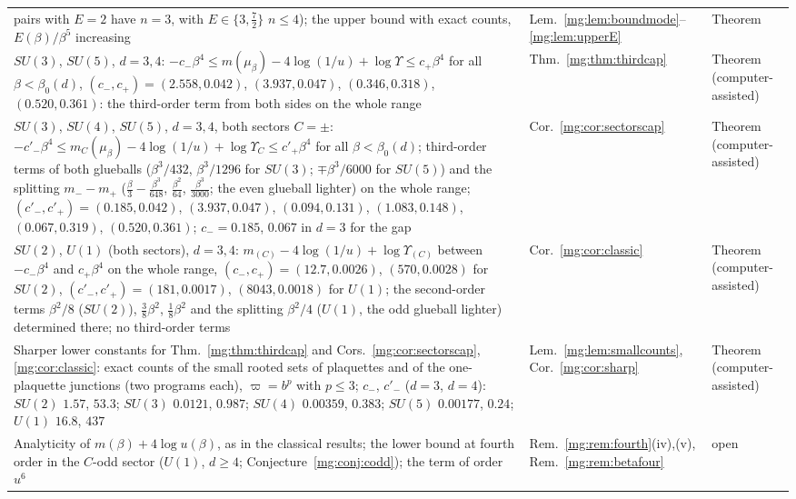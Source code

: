 \documentclass[11pt,a4paper]{article}
\theoremstyle{definition}
\theoremstyle{remark}
\begin{document}
\begin{longtable}{@{}p{}p{}p{}@{}}
pairs with $E=2$ have $n=3$, with $E\in\{3,\frac72\}$ $n\le4$); the upper bound with exact counts, $E(\beta)/\beta^5$ increasing & Lem.~\ref{mg:lem:boundmode}--\ref{mg:lem:upperE} & Theorem\\
$SU(3)$, $SU(5)$, $d=3,4$: $-c_-\beta^4\le m(\mu_\beta)-4\log(1/u)+\log\Upsilon\le c_+\beta^4$ for all $\beta<\beta_0(d)$, $(c_-,c_+)=(2.558,0.042)$, $(3.937,0.047)$, $(0.346,0.318)$, $(0.520,0.361)$: the third-order term from both sides on the whole range & Thm.~\ref{mg:thm:thirdcap} & Theorem (computer-assisted)\\
$SU(3)$, $SU(4)$, $SU(5)$, $d=3,4$, both sectors $C=\pm$: $-c'_-\beta^4\le m_C(\mu_\beta)-4\log(1/u)+\log\Upsilon_C\le c'_+\beta^4$ for all $\beta<\beta_0(d)$; third-order terms of both glueballs ($\beta^3/432$, $\beta^3/1296$ for $SU(3)$; $\mp\beta^3/6000$ for $SU(5)$) and the splitting $m_--m_+$ ($\frac\beta3-\frac{\beta^3}{648}$, $\frac{\beta^2}{64}$, $\frac{\beta^3}{3000}$; the even glueball lighter) on the whole range; $(c'_-,c'_+)=(0.185,0.042)$, $(3.937,0.047)$, $(0.094,0.131)$, $(1.083,0.148)$, $(0.067,0.319)$, $(0.520,0.361)$; $c_-=0.185$, $0.067$ in $d=3$ for the gap & Cor.~\ref{mg:cor:sectorscap} & Theorem (computer-assisted)\\
$SU(2)$, $U(1)$ (both sectors), $d=3,4$: $m_{(C)}-4\log(1/u)+\log\Upsilon_{(C)}$ between $-c_-\beta^4$ and $c_+\beta^4$ on the whole range, $(c_-,c_+)=(12.7,0.0026)$, $(570,0.0028)$ for $SU(2)$, $(c'_-,c'_+)=(181,0.0017)$, $(8043,0.0018)$ for $U(1)$; the second-order terms $\beta^2/8$ ($SU(2)$), $\frac38\beta^2$, $\frac18\beta^2$ and the splitting $\beta^2/4$ ($U(1)$, the odd glueball lighter) determined there; no third-order terms & Cor.~\ref{mg:cor:classic} & Theorem (computer-assisted)\\
Sharper lower constants for Thm.~\ref{mg:thm:thirdcap} and Cors.~\ref{mg:cor:sectorscap}, \ref{mg:cor:classic}: exact counts of the small rooted sets of plaquettes and of the one-plaquette junctions (two programs each), $\varpi=b^p$ with $p\le3$; $c_-$, $c'_-$ ($d=3$, $d=4$): $SU(2)$ $1.57$, $53.3$; $SU(3)$ $0.0121$, $0.987$; $SU(4)$ $0.00359$, $0.383$; $SU(5)$ $0.00177$, $0.24$; $U(1)$ $16.8$, $437$ & Lem.~\ref{mg:lem:smallcounts}, Cor.~\ref{mg:cor:sharp} & Theorem (computer-assisted)\\
Analyticity of $m(\beta)+4\log u(\beta)$, as in the classical results; the lower bound at fourth order in the $C$-odd sector ($U(1)$, $d\ge4$; Conjecture~\ref{mg:conj:codd}); the term of order $u^6$ & Rem.~\ref{mg:rem:fourth}(iv),(v), Rem.~\ref{mg:rem:betafour} & open\\
\end{longtable}
\endgroup
\end{document}
